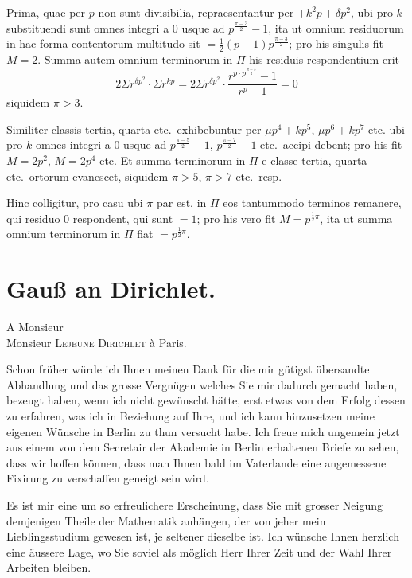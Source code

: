 \documentclass[10pt,a4paper]{article}
\begin{document}
Prima, quae per $p$ non sunt divisibilia, repraesentantur per $+k^2p + \delta p^2$, ubi pro $k$ substituendi sunt omnes integri a $0$ usque ad $p^{\frac{\pi-3}{2}}-1$, ita ut omnium residuorum in hac forma contentorum multitudo sit $= \frac{1}{2}(p-1)p^{\frac{\pi-3}{2}}$; pro his singulis fit $M = 2$. Summa autem omnium terminorum in $\Pi$ his residuis respondentium erit
\[
2\Sigma r^{\delta p^2} \cdot \Sigma r^{kp} = 2\Sigma r^{\delta p^2} \cdot \frac{r^{p\cdot p^{\frac{\pi-3}{2}}} - 1}{r^p - 1} = 0
\]
siquidem $\pi > 3$.

Similiter classis tertia, quarta etc.~exhibebuntur per $\mu p^4 + kp^5$, $\mu p^6 + kp^7$ etc. ubi pro $k$ omnes integri a $0$ usque ad $p^{\frac{\pi-5}{2}}-1$, $p^{\frac{\pi-7}{2}}-1$ etc.~accipi debent; pro his fit $M = 2p^2$, $M = 2p^4$ etc. Et summa terminorum in $\Pi$ e classe tertia, quarta etc.~ortorum evanescet, siquidem $\pi > 5$, $\pi > 7$ etc.~resp.

Hinc colligitur, pro casu ubi $\pi$ par est, in $\Pi$ eos tantummodo terminos remanere, qui residuo 0 respondent, qui sunt $= 1$; pro his vero fit $M = p^{\frac{1}{2}\pi}$, ita ut summa omnium terminorum in $\Pi$ fiat $= p^{\frac{1}{2}\pi}$.

\newpage

\section{Gau\ss{} an Dirichlet.}

\begin{flushright}
A Monsieur\\
Monsieur \textsc{Lejeune Dirichlet} \`a Paris.
\end{flushright}

\medskip

Schon fr\"uher w\"urde ich Ihnen meinen Dank f\"ur die mir g\"utigst \"ubersandte Abhandlung und das grosse Vergn\"ugen welches Sie mir dadurch gemacht haben, bezeugt haben, wenn ich nicht gew\"unscht h\"atte, erst etwas von dem Erfolg dessen zu erfahren, was ich in Beziehung auf Ihre, und ich kann hinzusetzen meine eigenen W\"unsche in Berlin zu thun versucht habe. Ich freue mich ungemein jetzt aus einem von dem Secretair der Akademie in Berlin erhaltenen Briefe zu sehen, dass wir hoffen k\"onnen, dass man Ihnen bald im Vaterlande eine angemessene Fixirung zu verschaffen geneigt sein wird.

Es ist mir eine um so erfreulichere Erscheinung, dass Sie mit grosser Neigung demjenigen Theile der Mathematik anh\"angen, der von jeher mein Lieblingsstudium gewesen ist, je seltener dieselbe ist. Ich w\"unsche Ihnen herzlich eine \"aussere Lage, wo Sie soviel als m\"oglich Herr Ihrer Zeit und der Wahl Ihrer Arbeiten bleiben.
\end{document}
